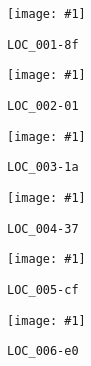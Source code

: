 \documentclass{article}
\newcommand{\img}[2]{
  \texttt{[image: \#1]}
  \begin{center}
   {\LARGE\tt #2}
  \end{center}
  \pagebreak 
}
\begin{document}
  \img{001.png}{LOC\_001-8f}
  \img{002.png}{LOC\_002-01}
  \img{003.png}{LOC\_003-1a}
  \img{004.png}{LOC\_004-37}
  \img{005.png}{LOC\_005-cf}
  \img{006.png}{LOC\_006-e0}
\end{document}
